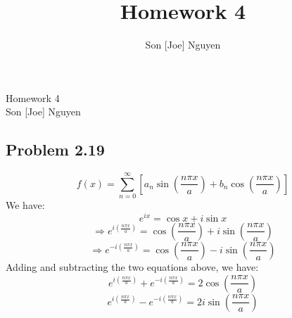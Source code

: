\documentclass{article}
\title{Homework 4}
\author{Son [Joe] Nguyen}
\begin{document}
\begin{center}
	\LARGE{Homework 4}\\[1em]
	\large Son [Joe] Nguyen\\[1em]
\end{center}
\subsection*{Problem 2.19}
\[f(x) = \sum_{n=0}^{\infty} \left[a_n \sin \left(\frac{n\pi x}{a}\right) + b_n \cos \left(\frac{n \pi x}{a}\right)\right]\]
We have:
\[e^{ix} = \cos x + i\sin x \]
\[\Rightarrow e^{i\left(\frac{n \pi x}{a}\right)} = \cos \left(\frac{n \pi x}{a}\right) + i \sin \left(\frac{n \pi x}{a}\right)\]
\[\Rightarrow e^{-i\left(\frac{n \pi x}{a}\right)} = \cos \left(\frac{n \pi x}{a}\right) - i \sin \left(\frac{n \pi x}{a}\right)\]
Adding and subtracting the two equations above, we have:
\[e^{i\left(\frac{n \pi x}{a}\right)} + e^{-i\left(\frac{n \pi x}{a}\right)} = 2\cos \left(\frac{n \pi x}{a}\right)\]
\[e^{i\left(\frac{n \pi x}{a}\right)} - e^{-i\left(\frac{n \pi x}{a}\right)} = 2 i \sin \left(\frac{n \pi x}{a}\right)\]
\end{document}

